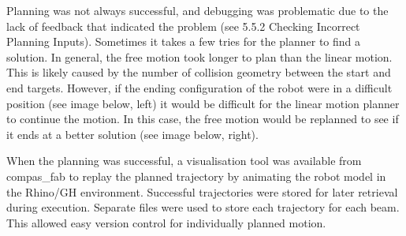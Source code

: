 \begin{itemize}
\begin{enumerate}
Planning was not always successful, and debugging was problematic due to the lack of feedback that indicated the problem (see 5.5.2 Checking Incorrect Planning Inputs). Sometimes it takes a few tries for the planner to find a solution. In general, the free motion took longer to plan than the linear motion. This is likely caused by the number of collision geometry between the start and end targets. However, if the ending configuration of the robot were in a difficult position (see image below, left) it would be difficult for the linear motion planner to continue the motion. In this case, the free motion would be replanned to see if it ends at a better solution (see image below, right).

When the planning was successful, a visualisation tool was available from compas_fab to replay the planned trajectory by animating the robot model in the Rhino/GH environment. Successful trajectories were stored for later retrieval during execution. Separate files were used to store each trajectory for each beam. This allowed easy version control for individually planned motion. 


\end{enumerate}
\end{itemize}
